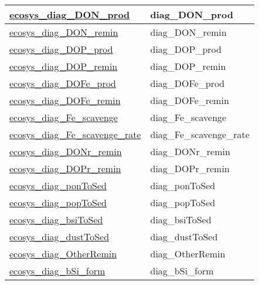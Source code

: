 {\begin{center}
\begin{longtable}{| p{2.0in} | p{4.0in} |}
    \hline
    \hyperref[subsec:var_sec_ecosysDiagFieldsLevel3_ecosys_diag_DON_prod]{ecosys\_diag\_DON\_prod} & diag\_DON\_prod \\
    \hline
    \hyperref[subsec:var_sec_ecosysDiagFieldsLevel3_ecosys_diag_DON_remin]{ecosys\_diag\_DON\_remin} & diag\_DON\_remin \\
    \hline
    \hyperref[subsec:var_sec_ecosysDiagFieldsLevel3_ecosys_diag_DOP_prod]{ecosys\_diag\_DOP\_prod} & diag\_DOP\_prod \\
    \hline
    \hyperref[subsec:var_sec_ecosysDiagFieldsLevel3_ecosys_diag_DOP_remin]{ecosys\_diag\_DOP\_remin} & diag\_DOP\_remin \\
    \hline
    \hyperref[subsec:var_sec_ecosysDiagFieldsLevel3_ecosys_diag_DOFe_prod]{ecosys\_diag\_DOFe\_prod} & diag\_DOFe\_prod \\
    \hline
    \hyperref[subsec:var_sec_ecosysDiagFieldsLevel3_ecosys_diag_DOFe_remin]{ecosys\_diag\_DOFe\_remin} & diag\_DOFe\_remin \\
    \hline
    \hyperref[subsec:var_sec_ecosysDiagFieldsLevel3_ecosys_diag_Fe_scavenge]{ecosys\_diag\_Fe\_scavenge} & diag\_Fe\_scavenge \\
    \hline
    \hyperref[subsec:var_sec_ecosysDiagFieldsLevel3_ecosys_diag_Fe_scavenge_rate]{ecosys\_diag\_Fe\_scavenge\_rate} & diag\_Fe\_scavenge\_rate \\
    \hline
    \hyperref[subsec:var_sec_ecosysDiagFieldsLevel3_ecosys_diag_DONr_remin]{ecosys\_diag\_DONr\_remin} & diag\_DONr\_remin \\
    \hline
    \hyperref[subsec:var_sec_ecosysDiagFieldsLevel3_ecosys_diag_DOPr_remin]{ecosys\_diag\_DOPr\_remin} & diag\_DOPr\_remin \\
    \hline
    \hyperref[subsec:var_sec_ecosysDiagFieldsLevel3_ecosys_diag_ponToSed]{ecosys\_diag\_ponToSed} & diag\_ponToSed \\
    \hline
    \hyperref[subsec:var_sec_ecosysDiagFieldsLevel3_ecosys_diag_popToSed]{ecosys\_diag\_popToSed} & diag\_popToSed \\
    \hline
    \hyperref[subsec:var_sec_ecosysDiagFieldsLevel3_ecosys_diag_bsiToSed]{ecosys\_diag\_bsiToSed} & diag\_bsiToSed \\
    \hline
    \hyperref[subsec:var_sec_ecosysDiagFieldsLevel3_ecosys_diag_dustToSed]{ecosys\_diag\_dustToSed} & diag\_dustToSed \\
    \hline
    \hyperref[subsec:var_sec_ecosysDiagFieldsLevel3_ecosys_diag_OtherRemin]{ecosys\_diag\_OtherRemin} & diag\_OtherRemin \\
    \hline
    \hyperref[subsec:var_sec_ecosysDiagFieldsLevel3_ecosys_diag_bSi_form]{ecosys\_diag\_bSi\_form} & diag\_bSi\_form \\
    \hline
\end{longtable}
\end{center}
}
